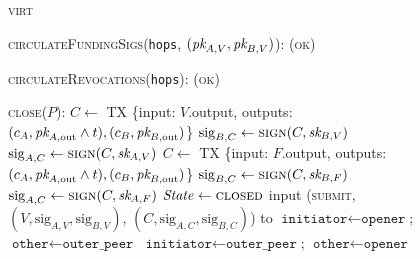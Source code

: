 \begin{figure}[H]
  \begin{processbox}{\textsc{virt}}
    \begin{algorithmic}[1]
      \State \textsc{circulateFundingSigs}(\texttt{hops}, $(\textit{pk}_{A, V},
      \textit{pk}_{B, V})$):
      \Indent
        \State \Return (\textsc{ok})
      \EndIndent
      \Statex

      \State \textsc{circulateRevocations}(\texttt{hops}):
      \Indent
        \State \Return (\textsc{ok})
      \EndIndent
      \Statex

      \State \textsc{close}($P$):
            \State {}
            \State $C \gets$ TX \{input: $V$.output, outputs: $(c_A, \textit{pk}_{A,
            \mathrm{out}} \wedge t), (c_B, \textit{pk}_{B, \mathrm{out}})$\}
            \State $\mathrm{sig}_{B, C} \gets \textsc{sign}(C, \textit{sk}_{B, V})$
            \State $\mathrm{sig}_{A, C} \gets \textsc{sign}(C, \textit{sk}_{A, V})$
          \Else
            \State $C \gets$ TX \{input: $F$.output, outputs: $(c_A, \textit{pk}_{A,
            \mathrm{out}} \wedge t), (c_B, \textit{pk}_{B, \mathrm{out}})$\}
            \State $\mathrm{sig}_{B, C} \gets \textsc{sign}(C, \textit{sk}_{B, F})$
            \State $\mathrm{sig}_{A, C} \gets \textsc{sign}(C, \textit{sk}_{A, F})$
          \EndIf
        \EndIf \: 
        \State $\mathit{State} \gets \textsc{closed}$
          \State input (\textsc{submit}, $(V, \mathrm{sig}_{A, V},
          \mathrm{sig}_{B, V})$, $(C, \mathrm{sig}_{A, C}, \mathrm{sig}_{B,
          C})$) to \ledger
        \Else \: 
            \State $\texttt{initiator} \gets \texttt{opener}$; $\texttt{other}
            \gets \texttt{outer\_peer}$
          \Else \: 
            \State $\texttt{initiator} \gets \texttt{outer\_peer}$;
            $\texttt{other} \gets \texttt{opener}$
          \EndIf
              \State {}
\end{algorithmic}
\end{processbox}
\end{figure}
